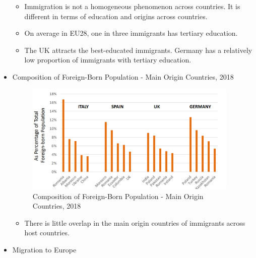 \begin{itemize}
\begin{itemize}
    \item Immigration is not a homogeneous phenomenon across countries. It is different in terms of education and origins across countries. 
    \item On average in EU28, one in three immigrants has tertiary education.
    \item The UK attracts the best-educated immigrants. Germany has a relatively low proportion of immigrants with tertiary education.
    \end{itemize}

\item Composition of Foreign-Born Population - Main Origin Countries, 2018
\begin{figure}[H]
                \centering
                \includegraphics[width=4in]{images/ch11/5.png}
                \caption{Composition of Foreign-Born Population - Main Origin Countries, 2018}
            \end{figure}
\begin{itemize}
    \item There is little overlap in the main origin countries of immigrants across host countries.
\end{itemize}

\item Migration to Europe


\end{itemize}
